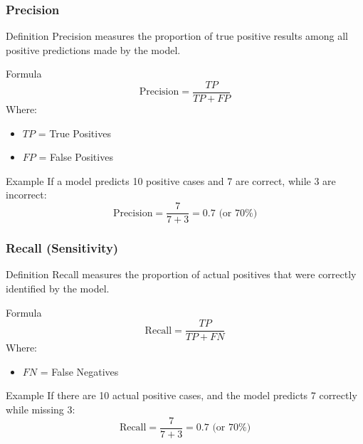 \documentclass[aspectratio=169]{beamer}
\begin{document}
\begin{frame}[fragile]
    \frametitle{Precision}
    \begin{block}{Definition}
        Precision measures the proportion of true positive results among all positive predictions made by the model.
    \end{block}
    \begin{block}{Formula}
        \begin{equation}
            \text{Precision} = \frac{TP}{TP + FP}
        \end{equation}
        Where:
        \begin{itemize}
            \item \( TP \) = True Positives
            \item \( FP \) = False Positives
        \end{itemize}
    \end{block}
    \begin{block}{Example}
        If a model predicts 10 positive cases and 7 are correct, while 3 are incorrect:
        \begin{equation}
            \text{Precision} = \frac{7}{7 + 3} = 0.7 \text{ (or 70\%)}
        \end{equation}
    \end{block}
\end{frame}

\begin{frame}[fragile]
    \frametitle{Recall (Sensitivity)}
    \begin{block}{Definition}
        Recall measures the proportion of actual positives that were correctly identified by the model.
    \end{block}
    \begin{block}{Formula}
        \begin{equation}
            \text{Recall} = \frac{TP}{TP + FN}
        \end{equation}
        Where:
        \begin{itemize}
            \item \( FN \) = False Negatives
        \end{itemize}
    \end{block}
    \begin{block}{Example}
        If there are 10 actual positive cases, and the model predicts 7 correctly while missing 3:
        \begin{equation}
            \text{Recall} = \frac{7}{7 + 3} = 0.7 \text{ (or 70\%)}
        \end{equation}
    \end{block}
\end{frame}
\end{document}
